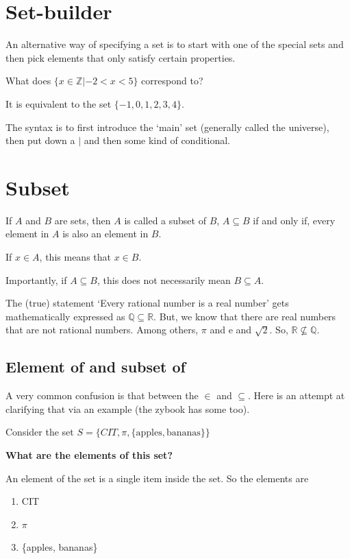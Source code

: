 \documentclass[12pt]{article}
\begin{document}
\section*{Set-builder}

An alternative way of specifying a set is to start with one of the special sets and then pick elements that only satisfy certain properties.

\medskip
What does $\{x \in \mathbb{Z}|-2 < x < 5\}$ correspond to?

It is equivalent to the set $\{-1, 0, 1, 2, 3, 4\}$.

\medskip

The syntax is to first introduce the `main' set (generally called the universe), then put down a $|$ and then some kind of conditional. 

\section*{Subset}
If $A$ and $B$ are sets, then $A$ is called a subset of $B$, $A \subseteq B$  if and only if, every element in $A$ is also an element in $B$.

If $x \in A$, this means that $x \in B$.

Importantly, if $A \subseteq B$, this does not necessarily mean $B \subseteq A$. 

The (true) statement `Every rational number is a real number' gets mathematically expressed as $\mathbb{Q} \subseteq \mathbb{R}$. But, we know that there are real numbers that are not rational numbers. Among others, $\pi$ and e and $\sqrt{2}$. So, $\mathbb{R} \not \subseteq \mathbb{Q}$.

\subsection*{Element of and subset of}

A very common confusion is that between the $\in$ and $\subseteq$. Here is an attempt at clarifying that via an example (the zybook has some too).

\medskip

Consider the set $S = \{CIT, \pi , \{\text{apples}, \text{bananas} \} \}$

\textbf{What are the elements of this set?}

An element of the set is a single item inside the set. So the elements are

\begin{enumerate}
\item CIT
\item $\pi$
\item \{apples, bananas\}
\end{enumerate}
\end{document}
